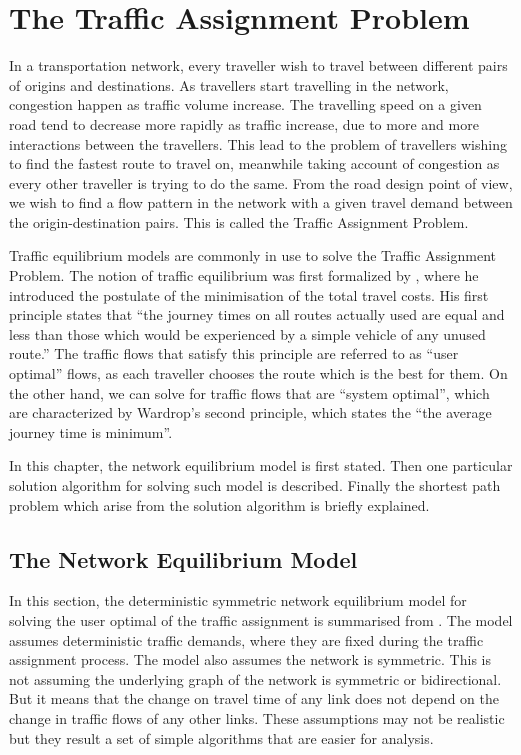 \chapter{The Traffic Assignment Problem}


In a transportation network,
every traveller wish to travel between different pairs of origins and destinations.
As travellers start travelling in the network,
congestion happen as traffic volume increase.
The travelling speed on a given road tend to decrease more rapidly as traffic increase,
due to more and more interactions between the travellers.
This lead to the problem of travellers wishing to find the fastest route to travel on,
meanwhile taking account of congestion as every other traveller is trying to do the same.
From the road design point of view,
we wish to find a flow pattern in the network with a given travel demand between the origin-destination pairs. 
This is called the Traffic Assignment Problem.

Traffic equilibrium models are commonly in use to solve the Traffic Assignment Problem.
The notion of traffic equilibrium was first formalized by \cite{Wardrop},
where he introduced the postulate of the minimisation of the total travel costs.
His first principle states that ``the journey times on all routes actually used are equal and less than those which would be experienced by a simple vehicle of any unused route.''
The traffic flows that satisfy this principle are referred to as ``user optimal'' flows,
as each traveller chooses the route which is the best for them.
On the other hand,
we can solve for traffic flows that are ``system optimal'',
which are characterized by Wardrop's second principle,
which states the ``the average journey time is minimum''.

In this chapter,
the network equilibrium model is first stated.
Then one particular solution algorithm for solving such model is described.
Finally the shortest path problem which arise from the solution algorithm is briefly explained.

\section{The Network Equilibrium Model}
In this section,
the deterministic symmetric network equilibrium model for solving the user optimal of the traffic assignment is summarised from \citet{Florian, Florian2008}.
The model assumes deterministic traffic demands,
where they are fixed during the traffic assignment process.
The model also assumes the network is symmetric.
This is not assuming the underlying graph of the network is symmetric or bidirectional.
But it means that the change on travel time of any link does not depend on the change in traffic flows of any other links.
These assumptions may not be realistic but they result a set of simple algorithms that are easier for analysis.

